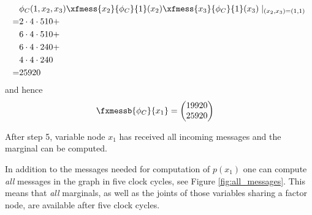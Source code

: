 \begin{exenumerate}
\begin{solution}
\begin{align}
                                   & \phi_C(1,x_2,x_3) \xfmess{x_2}{\phi_C}{1}(x_2) \xfmess{x_3}{\phi_C}{1}(x_3) \mid_{(x_2,x_3)=(1,1)}\\
                                   = & 2 \cdot 4 \cdot 510 +\\
                                   &  6 \cdot 4 \cdot 510 +  \\
                                   &  6 \cdot 4 \cdot 240  + \\
                                   &  4 \cdot 4 \cdot 240 \\
                                   = & 25920                 
      \end{align}
      and hence
      \begin{align}
        \fxmessb{\phi_C}{x_1} &= \begin{pmatrix}
          19920\\
          25920
        \end{pmatrix}
      \end{align}
     
      After step 5, variable node $x_1$ has received all incoming messages and the marginal can be computed.

In addition to the messages needed for computation of $p(x_1)$ one can
compute \emph{all} messages in the graph in five clock cycles, see
Figure \ref{fig:all_messages}. This means that \emph{all} marginals,
as well as the joints of those variables sharing a factor node, are
available after five clock cycles.

 \begin{figure}[h]
   \begin{center}
\end{center}
\end{figure}
\end{solution}
\end{exenumerate}
